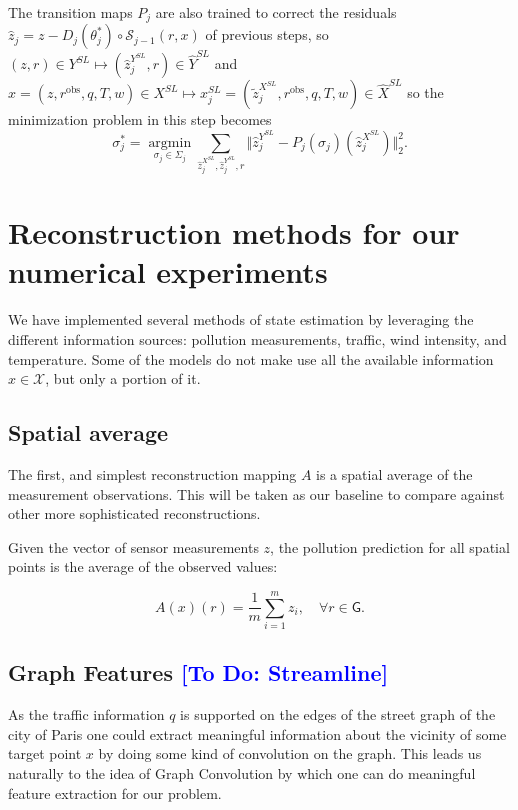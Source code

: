 \documentclass[11pt,a4paper,twoside]{article}
\theoremstyle{definition}
\numberwithin{equation}{section}
\newcommand{\cS}{\ensuremath{\mathcal{S}}}
\newcommand{\cX}{\ensuremath{\mathcal{X}}}
\newcommand{\G}{\ensuremath{\textsf{G}}} %
\newcommand{\<}{\langle}
\renewcommand{\>}{\rangle}
\newcommand{\argmin}{\operatorname{argmin}}
\newcommand{\obs}{\ensuremath{\text{obs}}}
\newcommand{\om}[1]{\textcolor{blue}{#1}}
\begin{document}
The transition maps $P_j$ are also trained to correct the residuals $\hat z_j=z - D_j(\theta_j^*)\circ\cS_{j-1}(r, x)$ of previous steps, so $(z, r)\in Y^{SL} \mapsto (\hat z_j^{Y^{SL}}, r) \in \hat Y^{SL}$ and $x = (z, r^\obs, q, T, w) \in X^{SL} \mapsto x_j^{SL} = (\tilde z_j^{X^{SL}}, r^\obs, q, T, w)  \in \hat X^{SL}$ so the minimization problem in this step becomes
$$
\sigma_j^* = \underset{\sigma_j \in \Sigma_j}{\argmin}
\sum_{\hat z_j^{X^{SL}}, \hat z_j^{Y^{SL}}, r}
\Vert \hat z_j^{Y^{SL}} - P_j(\sigma_j)(\hat z_j^{X^{SL}}) \Vert^2_2.
$$



\section{Reconstruction methods for our numerical experiments}
\label{sec:concrete-methods}
We have implemented several methods of state estimation by leveraging the different information sources: pollution measurements, traffic, wind intensity, and temperature. Some of the models do not make use all the available information $x\in \cX$, but only a portion of it.

\subsection{Spatial average}
\label{sec:snapshotmean}
The first, and simplest reconstruction mapping $A$ is a spatial average of the measurement observations. This will be taken as our baseline to compare against other more sophisticated reconstructions.

Given the vector of sensor measurements $z$, the pollution prediction for all spatial points is the average of the observed values:

$$
A(x)(r) = \frac{1}{m} \sum_{i=1}^m z_i, \quad \forall r\in \G.
$$

\subsection{Graph Features \om{[To Do: Streamline]}}
\label{sec:grpah_features}

As the traffic information $q$ is supported on the edges of the street graph of the city of Paris one could extract meaningful information about the vicinity of some target point $x$ by doing some kind of convolution on the graph. This leads us naturally to the idea of Graph Convolution by which one can do meaningful feature extraction for our problem.
\end{document}
